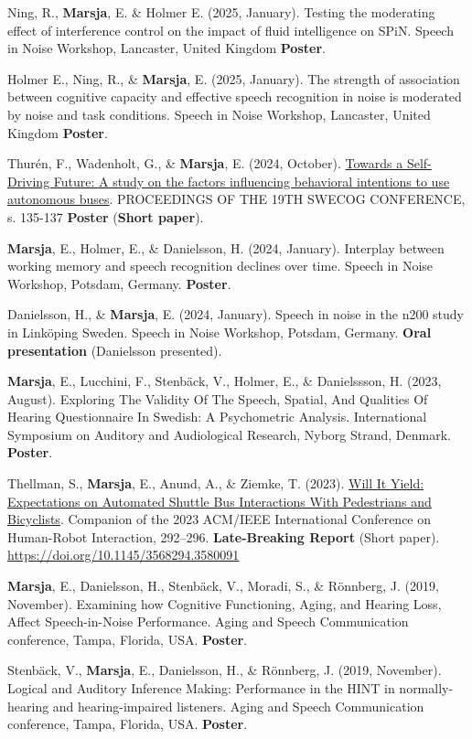 \documentclass[]{article}
\begin{document}
Ning, R., \textbf{Marsja}, E. \& Holmer E. (2025, January). Testing the
moderating effect of interference control on the impact of fluid
intelligence on SPiN. Speech in Noise Workshop, Lancaster, United
Kingdom \textbf{Poster}.

Holmer E., Ning, R., \& \textbf{Marsja}, E. (2025, January). The
strength of association between cognitive capacity and effective speech
recognition in noise is moderated by noise and task conditions. Speech
in Noise Workshop, Lancaster, United Kingdom \textbf{Poster}.

Thurén, F., Wadenholt, G., \& \textbf{Marsja}, E. (2024, October).
\href{https://swecog.se/files/SweCog2024_Proceedings.pdf}{Towards a
Self-Driving Future: A study on the factors influencing behavioral
intentions to use autonomous buses}. PROCEEDINGS OF THE 19TH SWECOG
CONFERENCE, s. 135-137 \textbf{Poster} (\textbf{Short paper}).

\textbf{Marsja}, E., Holmer, E., \& Danielsson, H. (2024, January).
Interplay between working memory and speech recognition declines over
time. Speech in Noise Workshop, Potsdam, Germany. \textbf{Poster}.

Danielsson, H., \& \textbf{Marsja}, E. (2024, January). Speech in noise
in the n200 study in Linköping Sweden. Speech in Noise Workshop,
Potsdam, Germany. \textbf{Oral presentation} (Danielsson presented).

\textbf{Marsja}, E., Lucchini, F., Stenbäck, V., Holmer, E., \&
Danielssson, H. (2023, August). Exploring The Validity Of The Speech,
Spatial, And Qualities Of Hearing Questionnaire In Swedish: A
Psychometric Analysis. International Symposium on Auditory and
Audiological Research, Nyborg Strand, Denmark. \textbf{Poster}.

Thellman, S., \textbf{Marsja}, E., Anund, A., \& Ziemke, T. (2023).
\href{https://dl.acm.org/doi/10.1145/3568294.3580091}{Will It Yield:
Expectations on Automated Shuttle Bus Interactions With Pedestrians and
Bicyclists}. Companion of the 2023 ACM/IEEE International Conference on
Human-Robot Interaction, 292--296. \textbf{Late-Breaking Report} (Short
paper). \url{https://doi.org/10.1145/3568294.3580091}

\textbf{Marsja}, E., Danielsson, H., Stenbäck, V., Moradi, S., \&
Rönnberg, J. (2019, November). Examining how Cognitive Functioning,
Aging, and Hearing Loss, Affect Speech-in-Noise Performance. Aging and
Speech Communication conference, Tampa, Florida, USA. \textbf{Poster}.

Stenbäck, V., \textbf{Marsja}, E., Danielsson, H., \& Rönnberg, J.
(2019, November). Logical and Auditory Inference Making: Performance in
the HINT in normally-hearing and hearing-impaired listeners. Aging and
Speech Communication conference, Tampa, Florida, USA. \textbf{Poster}.
\end{document}
